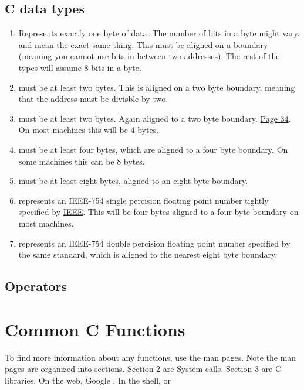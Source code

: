 \subsection{C data types}
\begin{enumerate}
\item {} Represents exactly one byte of data. The number of bits in a byte might vary.  and  mean the exact same thing. This must be aligned on a boundary (meaning you cannot use bits in between two addresses). The rest of the types will assume 8 bits in a byte.
\item {} must be at least two bytes. This is aligned on a two byte boundary, meaning that the address must be divisble by two.
\item {} must be at least two bytes. Again aligned to a two byte boundary. \href{http://www.open-std.org/jtc1/sc22/wg14/www/docs/n1124.pdf}{Page 34}. On most machines this will be 4 bytes.
\item {} must be at least four bytes, which are aligned to a four byte boundary. On some machines this can be 8 bytes.
\item {} must be at least eight bytes, aligned to an eight byte boundary.
\item {} represents an IEEE-754 single percision floating point number tightly specified by \href{http://ieeexplore.ieee.org/document/4610935/}{IEEE}. This will be four bytes aligned to a four byte boundary on most machines.
\item {} represents an IEEE-754 double percision floating point number specified by the same standard, which is aligned to the nearest eight byte boundary.
\end{enumerate}

\subsection{Operators}

\section{Common C Functions}

To find more information about any functions, use the man pages. Note the man pages are organized into sections. Section 2 are System calls. Section 3 are C libraries. On the web, Google . In the shell,  or 

